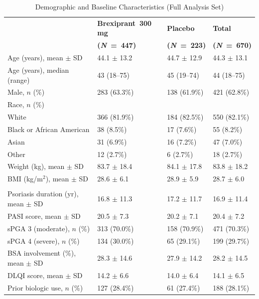 \documentclass[11pt, a4paper]{article}
\newcommand{\studydrug}{Brexiprant}
\newcommand{\studydose}{300 mg}
\begin{document}
\vspace{4pt}
\begin{table}[H]
\centering
\caption{Demographic and Baseline Characteristics (Full Analysis Set)}
\label{tab:demog}
\small
\begin{tabularx}{\linewidth}{@{}>{\raggedright\arraybackslash}p{52mm}@{\hspace{4mm}}C{28mm}@{\hspace{4mm}}C{28mm}@{\hspace{4mm}}C{28mm}@{}}
\toprule
& \textbf{\studydrug\ \studydose} & \textbf{Placebo} & \textbf{Total} \\
& \textbf{(\textit{N}\ =\ 447)} & \textbf{(\textit{N}\ =\ 223)} & \textbf{(\textit{N}\ =\ 670)} \\
\midrule
Age (years), mean $\pm$ SD     & 44.1 $\pm$ 13.2 & 44.7 $\pm$ 12.9 & 44.3 $\pm$ 13.1 \\
Age (years), median (range)    & 43 (18--75)     & 45 (19--74)     & 44 (18--75)    \\
Male, $n$ (\%)                  & 283 (63.3\%)    & 138 (61.9\%)    & 421 (62.8\%)   \\
\addlinespace
Race, $n$ (\%)\\
\quad White                     & 366 (81.9\%)    & 184 (82.5\%)    & 550 (82.1\%)   \\
\quad Black or African American & 38 (8.5\%)      & 17 (7.6\%)      & 55 (8.2\%)     \\
\quad Asian                     & 31 (6.9\%)      & 16 (7.2\%)      & 47 (7.0\%)     \\
\quad Other                     & 12 (2.7\%)      & 6 (2.7\%)       & 18 (2.7\%)     \\
\addlinespace
Weight (kg), mean $\pm$ SD     & 83.7 $\pm$ 18.4 & 84.1 $\pm$ 17.8 & 83.8 $\pm$ 18.2 \\
BMI (kg/m$^2$), mean $\pm$ SD  & 28.6 $\pm$ 6.1  & 28.9 $\pm$ 5.9  & 28.7 $\pm$ 6.0  \\
\midrule
{}\\
Psoriasis duration (yr), mean $\pm$ SD & 16.8 $\pm$ 11.3 & 17.2 $\pm$ 11.7 & 16.9 $\pm$ 11.4 \\
PASI score, mean $\pm$ SD     & 20.5 $\pm$ 7.3  & 20.2 $\pm$ 7.1  & 20.4 $\pm$ 7.2  \\
sPGA 3 (moderate), $n$ (\%)   & 313 (70.0\%)    & 158 (70.9\%)    & 471 (70.3\%)   \\
sPGA 4 (severe), $n$ (\%)     & 134 (30.0\%)    & 65 (29.1\%)     & 199 (29.7\%)   \\
BSA involvement (\%), mean $\pm$ SD & 28.3 $\pm$ 14.6 & 27.9 $\pm$ 14.2 & 28.2 $\pm$ 14.5 \\
DLQI score, mean $\pm$ SD     & 14.2 $\pm$ 6.6  & 14.0 $\pm$ 6.4  & 14.1 $\pm$ 6.5  \\
Prior biologic use, $n$ (\%)  & 127 (28.4\%)    & 61 (27.4\%)     & 188 (28.1\%)   \\
\bottomrule
\end{tabularx}
\end{table}
\end{document}
